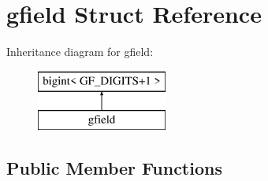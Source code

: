 \hypertarget{structgfield}{}\section{gfield Struct Reference}
\label{structgfield}
Inheritance diagram for gfield\+:\begin{figure}[H]
\begin{center}
\leavevmode
\includegraphics[height=2.000000cm]{structgfield}
\end{center}
\end{figure}
\subsection*{Public Member Functions}
